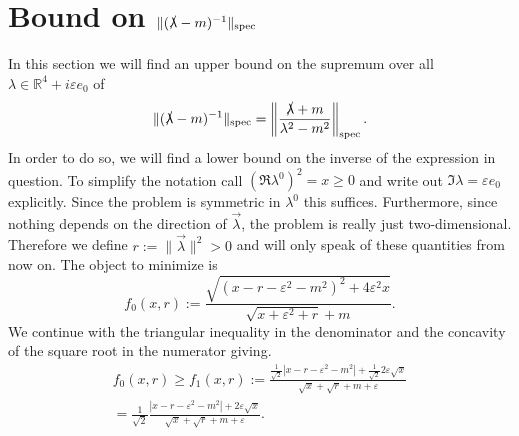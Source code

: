 \documentclass[b5paper,draft,openbib,12pt]{memoir}
\begin{document}
\section{Bound on \(\|(\slashed{\lambda}-m)^{-1}\|_{\text{spec}}\)}\label{Sec:SBound:Sec:richtig_abschaetzen}
In this section we will find an upper bound on  the supremum over all \(\lambda \in \mathbb{R}^4+i\varepsilon e_0\) of
\begin{equation}
\|(\slashed{\lambda}-m)^{-1}\|_{\text{spec}}= 
\left\| \frac{\slashed{\lambda}+m}{\lambda^2 - m^2}\right\|_{\text{spec}}.
\end{equation}
In order to do so, we will find a lower bound on the inverse of the expression in question. 
To simplify the notation call \(\left(\Re \lambda^0 \right)^2= x\ge 0\) and write out \(\Im \lambda= \varepsilon e_0\) explicitly.
Since the problem is symmetric in \(\lambda^0\) this suffices.
Furthermore, since nothing depends on the direction of \(\vec{\lambda}\), the problem is really just 
two-dimensional. Therefore we define \(r:=\|\vec{\lambda}\|^2>0\) and will only speak of these
quantities from now on. The object to minimize is
\begin{equation}
f_0(x,r):=\frac{\sqrt{(x-r -\varepsilon^2 -m^2)^2+ 4 \varepsilon^2 x}}{\sqrt{x+\varepsilon^2+r}+m}.
\end{equation}
We continue with the triangular inequality in the denominator and the concavity of the square root in the numerator giving.
\begin{multline}
f_0(x,r)\ge f_1(x,r):=\frac{\frac{1}{\sqrt{2}} \left|x-r-\varepsilon^2-m^2 \right| + \frac{1}{\sqrt{2}} 2 \varepsilon \sqrt{x}}{\sqrt{x}+\sqrt{r}+m+\varepsilon}\\
=\frac{1}{\sqrt{2}}\frac{\left|x-r-\varepsilon^2-m^2 \right| + 2 \varepsilon \sqrt{x}}{\sqrt{x}+\sqrt{r}+m+\varepsilon}.
\end{multline}
\end{document}
